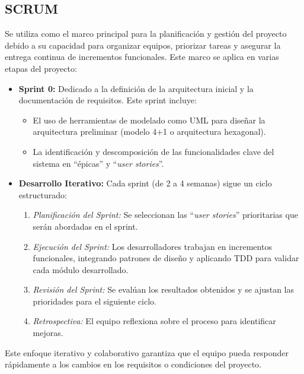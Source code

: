 \documentclass[conference]{IEEEtran}
\begin{document}
\subsection{SCRUM}
Se utiliza como el marco principal para la planificación y gestión del proyecto debido a su capacidad para organizar equipos, priorizar tareas y asegurar la entrega continua de incrementos funcionales. Este marco se aplica en varias etapas del proyecto:
\begin{itemize}
    \item \textbf{Sprint 0:} Dedicado a la definición de la arquitectura inicial y la documentación de requisitos. Este sprint incluye:
    \begin{itemize}
        \item El uso de herramientas de modelado como UML para diseñar la arquitectura preliminar (modelo 4+1 o arquitectura hexagonal).
        \item La identificación y descomposición de las funcionalidades clave del sistema en ``épicas'' y ``\textit{user stories}''.
    \end{itemize}
    \item \textbf{Desarrollo Iterativo:} Cada sprint (de 2 a 4 semanas) sigue un ciclo estructurado:
    \begin{enumerate}
        \item \textit{Planificación del Sprint:} Se seleccionan las ``\textit{user stories}'' prioritarias que serán abordadas en el sprint.
        \item \textit{Ejecución del Sprint:} Los desarrolladores trabajan en incrementos funcionales, integrando patrones de diseño y aplicando TDD para validar cada módulo desarrollado.
        \item \textit{Revisión del Sprint:} Se evalúan los resultados obtenidos y se ajustan las prioridades para el siguiente ciclo.
        \item \textit{Retrospectiva:} El equipo reflexiona sobre el proceso para identificar mejoras.
    \end{enumerate}
\end{itemize}
Este enfoque iterativo y colaborativo garantiza que el equipo pueda responder rápidamente a los cambios en los requisitos o condiciones del proyecto.\\
\end{document}

